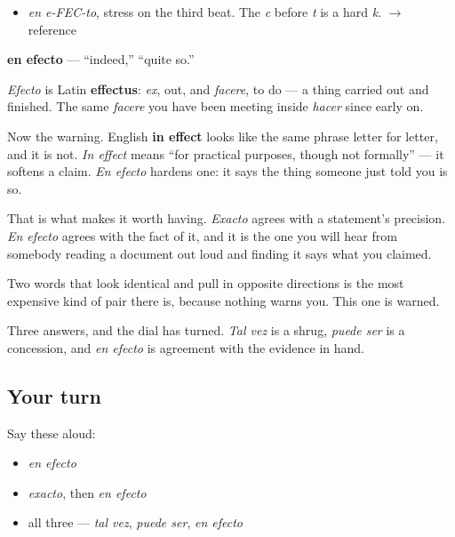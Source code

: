 \begin{sounds}
\begin{itemize}
\raggedright
  \item \emph{en e-FEC-to}, stress on the third beat. The \emph{c} before \emph{t} is a hard \emph{k}. $\to$ reference
\end{itemize}
\end{sounds}

\begin{cousinweb}
\textbf{en efecto} — \textquotedblleft{}indeed,\textquotedblright{} \textquotedblleft{}quite so.\textquotedblright{}

\emph{Efecto} is Latin \textbf{effectus}: \emph{ex}, out, and \emph{facere}, to do — a thing carried out and finished. The same \emph{facere} you have been meeting inside \emph{hacer} since early on.

Now the warning. English \textbf{in effect} looks like the same phrase letter for letter, and it is not. \emph{In effect} means \textquotedblleft{}for practical purposes, though not formally\textquotedblright{} — it softens a claim. \emph{En efecto} hardens one: it says the thing someone just told you is so.

That is what makes it worth having. \emph{Exacto} agrees with a statement's precision. \emph{En efecto} agrees with the fact of it, and it is the one you will hear from somebody reading a document out loud and finding it says what you claimed.

Two words that look identical and pull in opposite directions is the most expensive kind of pair there is, because nothing warns you. This one is warned.
\end{cousinweb}

\begin{grammarlens}[title={What you've built}]
Three answers, and the dial has turned. \emph{Tal vez} is a shrug, \emph{puede ser} is a concession, and \emph{en efecto} is agreement with the evidence in hand.
\end{grammarlens}

\subsection*{Your turn}
Say these aloud:

\begin{itemize}
\raggedright
  \item \emph{en efecto}
  \item \emph{exacto}, then \emph{en efecto}
  \item all three — \emph{tal vez}, \emph{puede ser}, \emph{en efecto}
\end{itemize}

